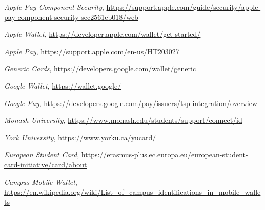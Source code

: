 \documentclass[10pt]{article}
\begin{document}
\begin{thebibliography}{9}
  \textit{Apple Pay Component Security},
  \url{https://support.apple.com/guide/security/apple-pay-component-security-sec2561eb018/web}

  \textit{Apple Wallet},
  \url{https://developer.apple.com/wallet/get-started/}

  \textit{Apple Pay},
  \url{https://support.apple.com/en-us/HT203027}

  \textit{Generic Cards},
  \url{https://developers.google.com/wallet/generic}

  \textit{Google Wallet},
  \url{https://wallet.google/}

  \textit{Google Pay},
  \url{https://developers.google.com/pay/issuers/tsp-integration/overview}

  \textit{Monash University},
  \url{https://www.monash.edu/students/support/connect/id}

  \textit{York University},
  \url{https://www.yorku.ca/yucard/}

  \textit{European Student Card},
  \url{https://erasmus-plus.ec.europa.eu/european-student-card-initiative/card/about}

  \textit{Campus Mobile Wallet},
  \url{https://en.wikipedia.org/wiki/List_of_campus_identifications_in_mobile_wallets}

\end{thebibliography}
\end{document}
